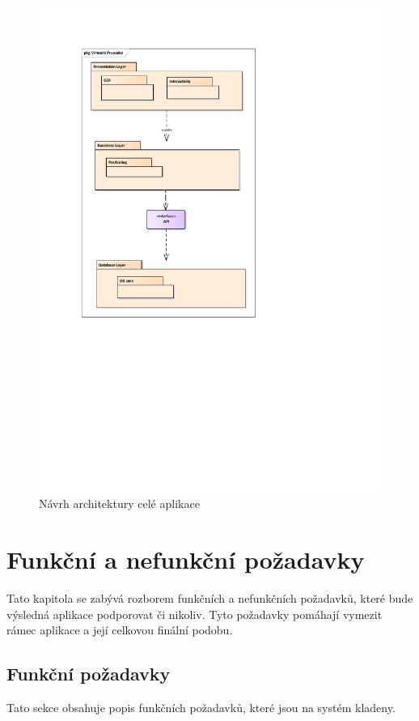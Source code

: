 \documentclass[thesis=B,czech]{FITthesis}[2012/06/26]
\begin{document}
	\begin{figure}
  		\includegraphics{architektura.pdf}
  		\caption{Návrh architektury celé aplikace}
  		\label{fig:architektura}
	\end{figure}
	
		\section{Funkční a nefunkční požadavky}
	Tato kapitola se zabývá rozborem funkčních a nefunkčních požadavků, které bude výsledná aplikace podporovat či nikoliv. Tyto požadavky pomáhají vymezit rámec aplikace a její celkovou finální podobu.
	
	\subsection{Funkční požadavky}	
	Tato sekce obsahuje popis funkčních požadavků, které jsou na systém kladeny.
	
\end{document}
